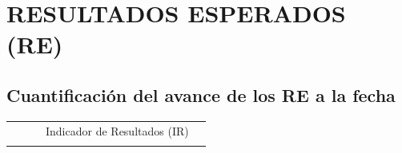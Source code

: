 \documentclass[11pt,]{article}
\begin{document}
\bigskip

\section{RESULTADOS ESPERADOS (RE)}\bigskip

\subsection{Cuantificación del avance de los RE a la fecha}\bigskip

\begin{table}[H]
\begin{tabular}{|l|c|c|c|l|l|l|l|c|}
\hline
\rowcolor[HTML]{EFEFEF} 
\multicolumn{1}{|c|}{\cellcolor[HTML]{EFEFEF}} & \cellcolor[HTML]{EFEFEF} & \cellcolor[HTML]{EFEFEF} & \multicolumn{5}{c|}{\cellcolor[HTML]{EFEFEF}Indicador de Resultados (IR)} & \cellcolor[HTML]{EFEFEF} \\ \cline{4-8}
\rowcolor[HTML]{EFEFEF} 

\end{tabular}
\end{table}
\end{document}
